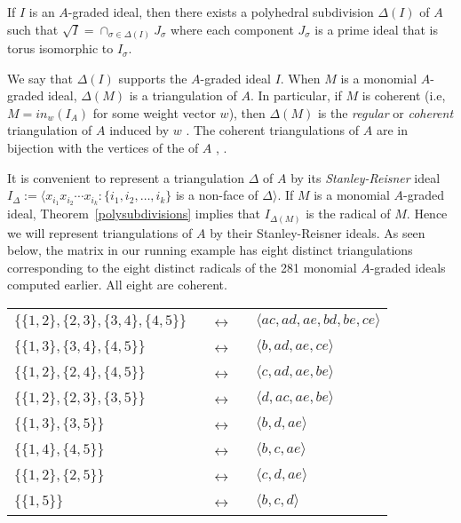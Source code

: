 \begin{theorem}\label{polysubdivisions}
  If $I$ is an $A$-graded ideal, then there exists a polyhedral
  subdivision $\Delta(I)$ of $A$ such that $\sqrt{I} = \cap_{\sigma
    \in \Delta(I)} J_{\sigma}$ where each component $J_{\sigma}$ is a
  prime ideal that is torus isomorphic to $I_{\sigma}$.
\end{theorem}

We say that $\Delta(I)$ supports the $A$-graded ideal $I$.
When $M$ is a monomial $A$-graded ideal, $\Delta(M)$ is a 
triangulation of $A$. In particular, if $M$ is coherent (i.e, $M =
in_w(I_A)$ for some weight vector $w$), then $\Delta(M)$ is the {\em
  regular} or {\em coherent} triangulation of $A$ induced by $w$
\cite[\S 8]{HS:St2}. The coherent triangulations of $A$ are in bijection
with the vertices of the {\em {}} of $A$ \cite{HS:BFS},
\cite{HS:GKZ}.  

It is convenient to represent a triangulation $\Delta$ of $A$ by its 
{\em Stanley-Reisner} ideal $I_{\Delta} := \langle x_{i_1}x_{i_2}
\cdots x_{i_k} : \{ i_1, i_2, \ldots, i_k \}$ is a non-face of  
$\Delta \rangle$. If $M$ is a monomial $A$-graded ideal,
Theorem~\ref{polysubdivisions} implies that $I_{\Delta(M)}$ is the 
radical of $M$. Hence we will represent triangulations 
of $A$ by their Stanley-Reisner ideals. As seen below, the matrix in
our running example has eight distinct triangulations 
corresponding to the eight distinct radicals of the 281 monomial 
$A$-graded ideals computed earlier. All eight are coherent.

\medskip

\begin{tabular}{lll}
{$\{\{1,2\},\{2,3\},\{3,4\},\{4,5\}\}$}
&\,\,\,\,$\leftrightarrow$\,\,\,\,& $\langle ac, ad, ae, bd, be, ce
\rangle$ \\  
{$\{\{1,3\},\{3,4\},\{4,5\}\}$} &\,\,\,\,$\leftrightarrow$\,\,\,\,&
$\langle b, ad, ae, ce \rangle$ \\  
{$\{\{1,2\},\{2,4\},\{4,5\}\}$} &\,\,\,\,$\leftrightarrow$\,\,\,\,&
$\langle c, ad, ae, be \rangle$ \\ 
{$\{\{1,2\},\{2,3\},\{3,5\}\}$} &\,\,\,\,$\leftrightarrow$\,\,\,\,&
$\langle d, ac, ae, be \rangle$ \\  
{$\{\{1,3\},\{3,5\}\}$} &\,\,\,\,$\leftrightarrow$\,\,\,\,& $\langle
b, d, ae \rangle$ \\ 
{$\{\{1,4\},\{4,5\}\}$} &\,\,\,\,$\leftrightarrow$\,\,\,\,& $\langle
b, c, ae \rangle$ \\  
{$\{\{1,2\},\{2,5\}\}$} &\,\,\,\,$\leftrightarrow$\,\,\,\,& $\langle
c, d, ae \rangle$ \\ 
{$\{\{1,5\}\}$} &\,\,\,\,$\leftrightarrow$\,\,\,\,& $\langle b, c, d
\rangle$   
\end{tabular}

